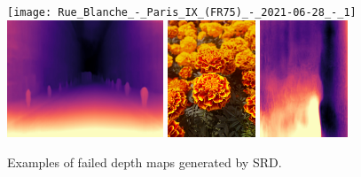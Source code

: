 \documentclass[12pt, letterpaper]{article}
\begin{document}
\begin{figure}[!ht]
\begin{center}
        \texttt{[image: Rue\_Blanche\_-\_Paris\_IX\_(FR75)\_-\_2021-06-28\_-\_1]}
        \includegraphics[height = 3.5cm]{RueBlancheStero1024}
        \includegraphics[height = 3.5cm]{example_0}
        \includegraphics[height = 3.5cm]{example_0_disp}
        \caption{Examples of failed depth maps generated by SRD.}
        \label{appSRD}
    \end{center}
\end{figure}
\vspace{2 cm}
\end{document}
